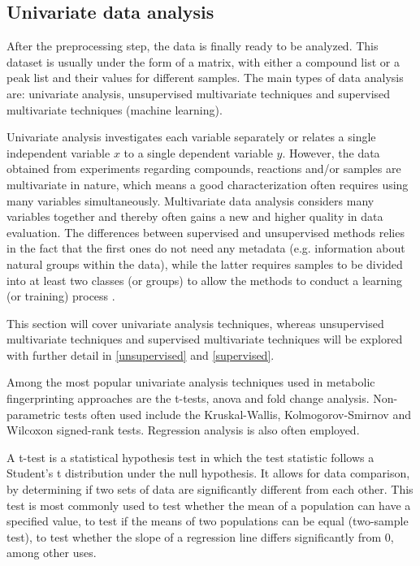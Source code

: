
\subsection{Univariate data analysis}

After the preprocessing step, the data is finally ready to be analyzed. This dataset is usually under the form of a matrix, with either a compound list or a peak list and their values for different samples. The main types of data analysis are: univariate analysis, unsupervised multivariate techniques and supervised multivariate techniques (machine learning).

Univariate analysis investigates each variable separately or relates a single independent variable $ x $ to a single dependent variable $ y $. However, the data obtained from experiments regarding compounds, reactions and/or samples are multivariate in nature, which means a good characterization often requires using many variables simultaneously. Multivariate data analysis considers many variables together and thereby often gains a new and higher quality in data evaluation. The differences between supervised and unsupervised methods relies in the fact that the first ones do not need any metadata (e.g. information about natural groups within the data), while the latter requires samples to be divided into at least two classes (or groups) to allow the methods to conduct a learning (or training) process \citep{varmuza2009introduction}.

This section will cover univariate analysis techniques, whereas unsupervised multivariate techniques and supervised multivariate techniques will be explored with further detail in \autoref{unsupervised} and \autoref{supervised}. 

Among the most popular univariate analysis techniques used in metabolic fingerprinting approaches are the t-tests, \acrfull{anova} and fold change analysis. Non-parametric tests often used include the Kruskal-Wallis, Kolmogorov-Smirnov and Wilcoxon signed-rank tests. Regression analysis is also often employed. 

A t-test is a statistical hypothesis test in which the test statistic follows a Student's t distribution under the null hypothesis. It allows for data comparison, by determining if two sets of data are significantly different from each other. This test is most commonly used to test whether the mean of a population can have a specified value, to test if the means of two populations can be equal (two-sample test), to test whether the slope of a regression line differs significantly from 0, among other uses.

